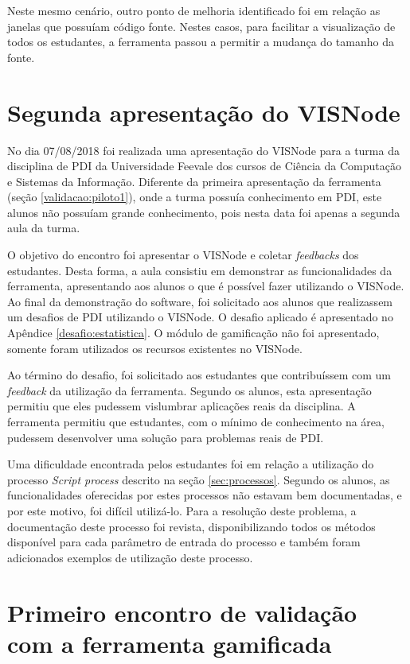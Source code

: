 \documentclass[
	12pt,				%
	oneside,			%
	a4paper,			%
	english,			%
	french,				%
	spanish,			%
	brazil,				%
	]{abntex2}
\begin{document}
Neste mesmo cenário, outro ponto de melhoria identificado foi em relação as janelas que possuíam código fonte. Nestes casos, para facilitar a visualização de todos os estudantes, a ferramenta  passou a permitir a mudança do tamanho da fonte.

\section{Segunda apresentação do VISNode}

No dia 07/08/2018 foi realizada uma apresentação do VISNode para a turma da disciplina de PDI da Universidade Feevale dos cursos de Ciência da Computação e Sistemas da Informação. Diferente da primeira apresentação da ferramenta (seção \ref{validacao:piloto1}), onde a turma possuía conhecimento em PDI, este alunos não possuíam grande conhecimento, pois nesta data foi apenas a segunda aula da turma. 

O objetivo do encontro foi apresentar o VISNode e coletar \textit{feedbacks} dos estudantes. Desta forma, a aula consistiu em demonstrar as funcionalidades da ferramenta, apresentando aos alunos o que é possível fazer utilizando o VISNode. Ao final da demonstração do software, foi solicitado aos alunos que realizassem um desafios de PDI utilizando o VISNode. O desafio aplicado é apresentado no Apêndice \ref{desafio:estatistica}. O módulo de gamificação não foi apresentado, somente foram utilizados os recursos existentes no VISNode.

Ao término do desafio, foi solicitado aos estudantes que contribuíssem com um \textit{feedback} da utilização da ferramenta. Segundo os alunos, esta apresentação permitiu que eles pudessem vislumbrar aplicações reais da disciplina. A ferramenta permitiu que estudantes, com o mínimo de conhecimento na área, pudessem desenvolver uma solução para problemas reais de PDI.

Uma dificuldade encontrada pelos estudantes foi em relação a utilização do processo \textit{Script process} descrito na seção \ref{sec:processos}. Segundo os alunos, as funcionalidades oferecidas por estes processos não estavam bem documentadas, e por este motivo, foi difícil utilizá-lo. Para a resolução deste problema, a documentação deste processo foi revista, disponibilizando todos os métodos disponível para cada parâmetro de entrada do processo e também foram adicionados exemplos de utilização deste processo.

\section{Primeiro encontro de validação com a ferramenta gamificada}
\label{sec:validacaoPrimeiroEncontro}
\end{document}
